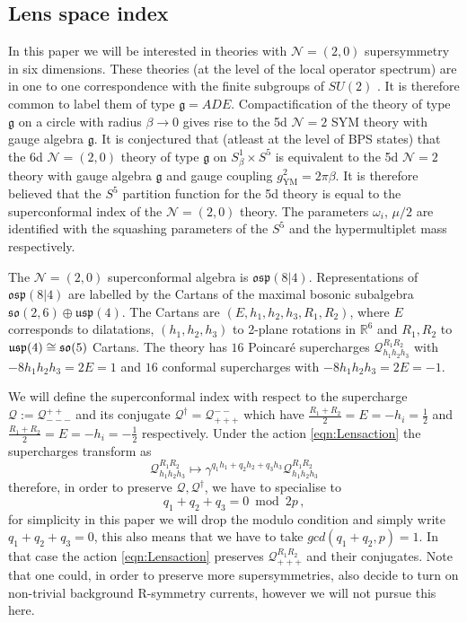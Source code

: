 \documentclass[main.tex]{subfiles}
\begin{document}
\subsection{Lens space index}
In this paper we will be interested in theories with $\mathcal{N}=(2,0)$ supersymmetry in six dimensions. These theories (at the level of the local operator spectrum) are in one to one correspondence with the finite subgroups of $SU(2)$ \cite{Witten:1995zh,Hanany:2000fq}. It is therefore common to label them of type $\mathfrak{g}=ADE$. Compactification of the theory of type $\mathfrak{g}$ on a circle with radius $\beta\to0$ gives rise to the 5d $\mathcal{N}=2$ SYM theory with gauge algebra $\mathfrak{g}$.  It is conjectured that (atleast at the level of BPS states) that the 6d $\mathcal{N}=(2,0)$ theory of type $\mathfrak{g}$ on $S_{\beta}^1\times S^5$ is equivalent to the 5d $\mathcal{N}=2$ theory with gauge algebra $\mathfrak{g}$ and gauge coupling $g^2_{\text{YM}}=2\pi\beta$. It is therefore believed that the $S^5$ partition function for the 5d theory is equal to the superconformal index of the $\mathcal{N}=(2,0)$ theory. The parameters $\omega_i$, $\mu/2$ are identified with the squashing parameters of the $S^5$ and the hypermultiplet mass \cite{Kim:2012ava} respectively.

The $\mathcal{N}=(2,0)$ superconformal algebra is $\mathfrak{osp}(8|4)$. Representations of $\mathfrak{osp}(8|4)$ are labelled by the Cartans of the maximal bosonic subalgebra $\mathfrak{so}(2,6)\oplus\mathfrak{usp}(4)$. The Cartans are $(E,h_1,h_2,h_3,R_1,R_2)$, where $E$ corresponds to dilatations, $(h_1,h_2,h_3)$ to 2-plane rotations in $\mathbb{R}^6$ and $R_1,R_2$ to $\mathfrak{usp}(4)\cong\mathfrak{so}(5)$ Cartans. 
The theory has $16$ Poincar\'e supercharges $\mathcal{Q}^{R_1R_2}_{h_1h_2h_3}$ with $-8h_1h_2h_3=2E=1$ and $16$ conformal supercharges with $-8h_1h_2h_3=2E=-1$.

We will define the superconformal index with respect to the supercharge $\mathcal{Q}:=\mathcal{Q}^{++}_{---}$ and its conjugate $\mathcal{Q}^{\dagger}=\mathcal{Q}^{--}_{+++}$ which have $\frac{R_1+R_2}{2}=E=-h_i=\frac{1}{2}$ and $\frac{R_1+R_2}{2}=E=-h_i=-\frac{1}{2}$ respectively.
Under the action \eqref{eqn:Lensaction} the supercharges transform as
\begin{equation}
\mathcal{Q}^{R_1R_2}_{h_1h_2h_3}\mapsto\gamma^{q_1h_1+q_2h_2+q_3h_3}\mathcal{Q}^{R_1R_2}_{h_1h_2h_3}
\end{equation}
therefore, in order to preserve $\mathcal{Q},\mathcal{Q}^{\dagger}$, we have to specialise to
\begin{equation}\label{eqn:qspecialisation}
q_1+q_2+q_3=0\bmod 2p\,,
\end{equation}
for simplicity in this paper we will drop the modulo condition and simply write $q_1+q_2+q_3=0$, this also means that we have to take $gcd(q_1+q_2,p)=1$. In that case the action \eqref{eqn:Lensaction} preserves $\mathcal{Q}_{+++}^{R_1R_2}$ and their conjugates. Note that one could, in order to preserve more supersymmetries, also decide to turn on non-trivial background R-symmetry currents, however we will not pursue this here.
\end{document}

